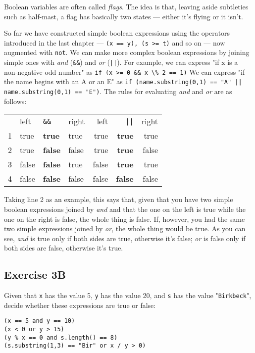 Boolean variables are often called \emph{flags}.  The idea is that,
leaving aside subtleties such as half-mast, a flag has basically two states
--- either it's flying or it isn't.

So far we have constructed simple boolean expressions using the operators
introduced in the last chapter --- \texttt{(x == y), (s >= t)} and so on ---
now augmented with \texttt{not}.  We can make more complex boolean expressions
by joining simple ones with \emph{and}  (\verb!&&!) and \emph{or} (\texttt{||}).
For example, we can express "if x is a non-negative odd number" as
\verb+if (x >= 0 && x \% 2 == 1)+  We can express "if the name begins with an
A or an E" as \texttt{if (name.substring(0,1) == "A" || name.substring(0,1) == "E")}.
The rules for evaluating \emph{and} and \emph{or} are as follows:
 
\begin{tabular}{llllrrr}
& left & \verb!&&! & right & left & \verb+||+ & right\\
1 & true & \textbf{true} & true&true&\textbf{true}&true\\
2 & true & \textbf{false} & false&true&\textbf{true}&false\\
3 & false & \textbf{false} & true&false&\textbf{true}&true\\
4 & false & \textbf{false} & false&false&\textbf{false}&false\\
\end{tabular}

Taking line 2 as an example, this says that, given that you have two simple
boolean expressions joined by \emph{and} and that the one on the left is
true while the one on the right is false, the whole thing is false.  If,
however, you had the same two simple expressions joined by \emph{or}, the
whole thing would be true.  As you can see, \emph{and} is true only if both
sides are true, otherwise it's false; \emph{or} is false only if both sides
are false, otherwise it's true.

\subsection{Exercise 3B}

Given that \texttt{x} has the value 5, \texttt{y} has the value 20,
and  \texttt{s} has the value "\texttt{Birkbeck}", decide whether these expressions
are true or false:
\begin{Verbatim}
(x == 5 and y == 10)
(x < 0 or y > 15)
(y % x == 0 and s.length() == 8)
(s.substring(1,3) == "Bir" or x / y > 0)
\end{Verbatim}

